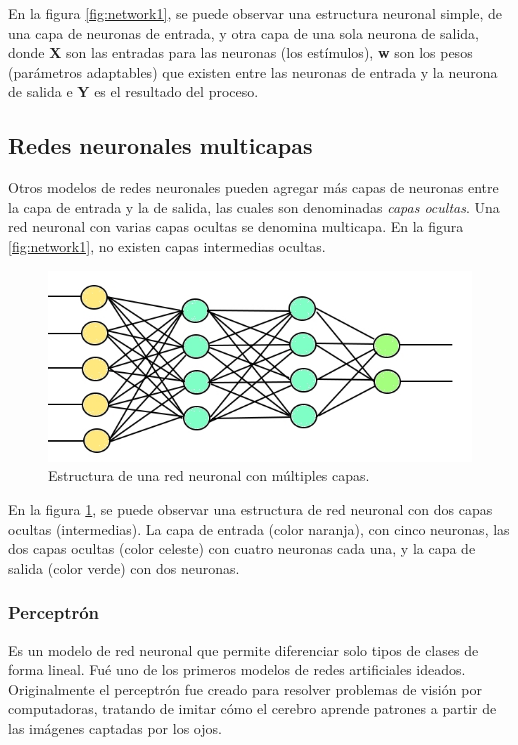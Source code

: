 \documentclass[a4paper,12pt,oneside,spanish]{book}
\begin{document}
En la figura \ref{fig:network1}, se puede observar una estructura neuronal simple, de una capa de neuronas de entrada, y otra capa de una sola neurona de salida, donde \textbf{X} son las entradas para las neuronas (los estímulos), \textbf{w} son los pesos (parámetros adaptables) que existen entre las neuronas de entrada y la neurona de salida e \textbf{Y} es el resultado del proceso. \par

\subsection{Redes neuronales multicapas}

Otros modelos de redes neuronales pueden agregar más capas de neuronas entre la capa de entrada y la de salida, las cuales son denominadas \textit{capas ocultas}. Una red neuronal con varias capas ocultas se denomina multicapa. En la figura \ref{fig:network1}, no existen capas intermedias ocultas.

\begin{figure}[h!]
	\includegraphics[width=380pt]{Imagenes/network2.jpg}
	\centering
	\caption{Estructura de una red neuronal con múltiples capas.}
	\label{fig:network2}
\end{figure}

En la figura \ref{fig:network2}, se puede observar una estructura de red neuronal con dos capas ocultas (intermedias). La capa de entrada (color naranja), con cinco neuronas, las dos capas ocultas (color celeste) con cuatro neuronas cada una, y la capa de salida (color verde) con dos neuronas.\par

\subsubsection{Perceptrón}
Es un modelo de red neuronal que permite diferenciar solo tipos de clases de forma lineal. Fué uno de los primeros modelos de redes artificiales ideados. Originalmente el perceptrón fue creado para resolver problemas de visión por computadoras, tratando de imitar cómo el cerebro aprende patrones a partir de las imágenes captadas por los ojos.\par
\end{document}
